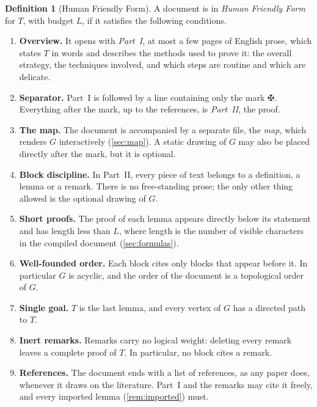 \documentclass[11pt]{article}
\theoremstyle{plain}
\theoremstyle{definition}
\newtheorem{definition}[theorem]{Definition}
\theoremstyle{remark}
\theoremstyle{definition}
\theoremstyle{plain}
\theoremstyle{remark}
\begin{document}
\begin{definition}[Human Friendly Form]\label{def:hff}
A document is in \emph{Human Friendly Form} for $T$, with budget $L$, if it satisfies the following conditions.
\begin{enumerate}[label=\textbf{(H\arabic*)}, leftmargin=3.2em]
  \item\label{H:overview} \textbf{Overview.} It opens with \emph{Part~I}, at most a few pages of English prose, which states $T$ in words and describes the methods used to prove it: the overall strategy, the techniques involved, and which steps are routine and which are delicate.
  \item\label{H:mark} \textbf{Separator.} Part~I is followed by a line containing only the mark $\maltese$. Everything after the mark, up to the references, is \emph{Part~II}, the proof.
  \item\label{H:graph} \textbf{The map.} The document is accompanied by a separate file, the \emph{map}, which renders $G$ interactively (\cref{sec:map}). A static drawing of $G$ may also be placed directly after the mark, but it is optional.
  \item\label{H:blocks} \textbf{Block discipline.} In Part~II, every piece of text belongs to a definition, a lemma or a remark. There is no free-standing prose; the only other thing allowed is the optional drawing of $G$.
  \item\label{H:short} \textbf{Short proofs.} The proof of each lemma appears directly below its statement and has length less than $L$, where length is the number of visible characters in the compiled document (\cref{sec:formulas}).
  \item\label{H:order} \textbf{Well-founded order.} Each block cites only blocks that appear before it. In particular $G$ is acyclic, and the order of the document is a topological order of $G$.
  \item\label{H:sink} \textbf{Single goal.} $T$ is the last lemma, and every vertex of $G$ has a directed path to $T$.
  \item\label{H:inert} \textbf{Inert remarks.} Remarks carry no logical weight: deleting every remark leaves a complete proof of $T$. In particular, no block cites a remark.
  \item\label{H:refs} \textbf{References.} The document ends with a list of references, as any paper does, whenever it draws on the literature. Part~I and the remarks may cite it freely, and every imported lemma (\cref{rem:imported}) must.
\end{enumerate}
\end{definition}
\end{document}
